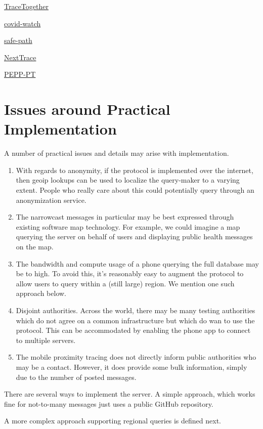 \documentclass{article}
\begin{document}
\href{https://www.tracetogether.gov.sg/}{TraceTogether}

\href{https://www.covid-watch.org/article}{covid-watch}

\href{http://safepaths.mit.edu/}{safe-path}

\href{https://nexttrace.org/about}{NextTrace}

\href{https://www.pepp-pt.org/}{PEPP-PT}


\section{Issues around Practical Implementation}

A number of practical issues and details may arise with implementation.
\begin{enumerate}
    \item With regards to anonymity, if the protocol is implemented over the internet, then geoip lookups can be used to localize the query-maker to a varying extent.  People who really care about this could potentially query through an anonymization service.
    \item The narrowcast messages in particular may be best expressed through existing software map technology.   For example, we could imagine a map querying the server on behalf of users and displaying public health messages on the map.  
    \item The bandwidth and compute usage of a phone querying the full database may be to high.  To avoid this, it's reasonably easy to augment the protocol to allow users to query within a (still large) region.  We mention one such approach below.  
    \item Disjoint authorities.  Across the world, there may be many testing authorities which do not agree on a common infrastructure but which do wan to use the protocol.  This can be accommodated by enabling the phone app to connect to multiple servers. 
    \item The mobile proximity tracing does not directly inform public authorities who may be a contact.  However, it does provide some bulk information, simply due to the number of posted messages. 
\end{enumerate}

There are several ways to implement the server.  A simple approach, which works fine for not-to-many messages just uses a public GitHub repository.

A more complex approach supporting regional queries is defined next.  
\end{document}
